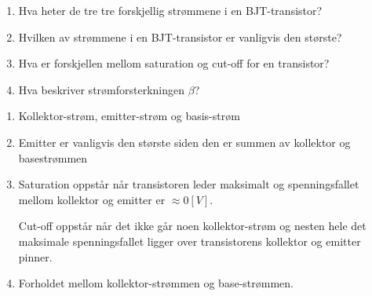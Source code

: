 \begin{question}[name=Oppgave, topic=transBJT]
	\begin{enumerate}[label=\roman*)]
		\item Hva heter de tre tre forskjellig strømmene i en BJT-transistor?
		\item Hvilken av strømmene i en BJT-transistor er vanligvis den største?
		\item Hva er forskjellen mellom saturation og cut-off for en transistor?
		\item Hva beskriver strømforsterkningen $\beta$?
	\end{enumerate}

\end{question}

\vspace{0.5cm} %

\begin{solution}[name=Løsningsforslag oppgave]
		\begin{enumerate}[label=\roman*)]
		\item Kollektor-strøm, emitter-strøm og basis-strøm
		\item Emitter er vanligvis den største siden den er summen av kollektor og basestrømmen
		\item Saturation oppstår når transistoren leder maksimalt og spenningsfallet mellom kollektor og emitter er $\approx 0 [V]$.

		Cut-off oppstår når det ikke går noen kollektor-strøm og nesten hele det maksimale spenningsfallet ligger over transistorens kollektor og emitter pinner.
		\item Forholdet mellom kollektor-strømmen og base-strømmen.
	\end{enumerate}

\end{solution}


